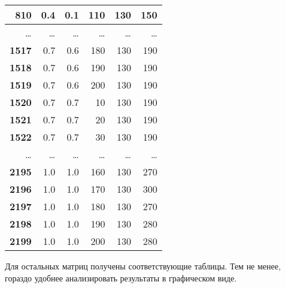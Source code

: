 \documentclass[a4paper,12pt]{article}
\begin{document}
\begin{table} [h!]
\begin{center}
\begin{tabular}{|r|r|r|r|r|r|}
			\hline
			{\bf 810} &        0.4 &        0.1 &      110 &        130 &        150 \\
			\hline
			\ldots & \ldots & \ldots & \ldots & \ldots & \ldots\\
			\hline
			{\bf 1517} &        0.7 &        0.6 &        180 &        130 &        190 \\
			\hline
			{\bf 1518} &        0.7 &        0.6 &        190 &        130 &        190 \\
			\hline
			{\bf 1519} &        0.7 &        0.6 &        200 &        130 &        190 \\
			\hline
			{\bf 1520} &        0.7 &        0.7 &         10 &        130 &        190 \\
			\hline
			{\bf 1521} &        0.7 &        0.7 &         20 &        130 &        190 \\
			\hline
			{\bf 1522} &        0.7 &        0.7 &         30 &        130 &        190 \\
			\hline
			\ldots & \ldots & \ldots & \ldots & \ldots & \ldots\\
			\hline
			{\bf 2195} &        1.0 &        1.0 &      160 &        130 &        270 \\
			\hline
			{\bf 2196} &        1.0 &        1.0 &      170 &        130 &        300 \\
			\hline
			{\bf 2197} &        1.0 &        1.0 &      180 &        130 &        270 \\
			\hline
			{\bf 2198} &        1.0 &        1.0 &      190 &        130 &        280 \\
			\hline
			{\bf 2199} &        1.0 &        1.0 &      200 &        130 &        280 \\
			\hline
		\end{tabular}  
		\label{param1}
	\end{center}
\end{table} 

Для остальных матриц получены соответствующие таблицы. Тем
не менее, гораздо удобнее
анализировать результаты в графическом виде.

\pagebreak

\end{document}
